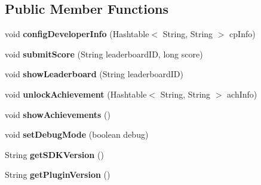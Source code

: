 \subsection*{Public Member Functions}
\begin{DoxyCompactItemize}
\item 
\mbox{\label{interfaceorg_1_1cocos2dx_1_1plugin_1_1InterfaceSocial_a029ab8c8ff2fe2674f1f649f227f5592}} 
void {\bfseries config\+Developer\+Info} (Hashtable$<$ String, String $>$ cp\+Info)
\item 
\mbox{\label{interfaceorg_1_1cocos2dx_1_1plugin_1_1InterfaceSocial_a569f77ec14ef9ac31e90e998858f9655}} 
void {\bfseries submit\+Score} (String leaderboard\+ID, long score)
\item 
\mbox{\label{interfaceorg_1_1cocos2dx_1_1plugin_1_1InterfaceSocial_af453ddc9c59c364f07ba6b06c0a08cc3}} 
void {\bfseries show\+Leaderboard} (String leaderboard\+ID)
\item 
\mbox{\label{interfaceorg_1_1cocos2dx_1_1plugin_1_1InterfaceSocial_ad930e0bbf5e5a2f5ad5bad08f702486f}} 
void {\bfseries unlock\+Achievement} (Hashtable$<$ String, String $>$ ach\+Info)
\item 
\mbox{\label{interfaceorg_1_1cocos2dx_1_1plugin_1_1InterfaceSocial_ae71b892351dba0e5369b4746816e1fd6}} 
void {\bfseries show\+Achievements} ()
\item 
\mbox{\label{interfaceorg_1_1cocos2dx_1_1plugin_1_1InterfaceSocial_a402ea460c7abae977a94e3be90b78c52}} 
void {\bfseries set\+Debug\+Mode} (boolean debug)
\item 
\mbox{\label{interfaceorg_1_1cocos2dx_1_1plugin_1_1InterfaceSocial_a5af50de7606368b930c721ce6282de62}} 
String {\bfseries get\+S\+D\+K\+Version} ()
\item 
\mbox{\label{interfaceorg_1_1cocos2dx_1_1plugin_1_1InterfaceSocial_ab00a87b3ded9971e484e6d589643dbda}} 
String {\bfseries get\+Plugin\+Version} ()
\end{DoxyCompactItemize}
